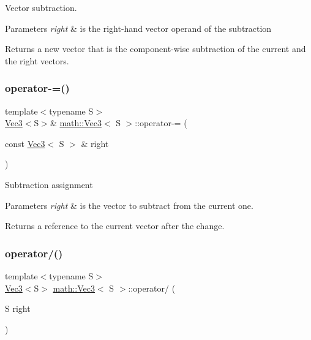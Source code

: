 Vector subtraction.


\begin{DoxyParams}{Parameters}
{\em right} & is the right-\/hand vector operand of the subtraction\\
\hline
\end{DoxyParams}
\begin{DoxyReturn}{Returns}
a new vector that is the component-\/wise subtraction of the current and the right vectors. 
\end{DoxyReturn}
\mbox{\label{classmath_1_1_vec3_a8e49dbf07da4a23576e7b76d3465279d}} 
\subsubsection{\texorpdfstring{operator-\/=()}{operator-=()}}
{\footnotesize\ttfamily template$<$typename S$>$ \\
\hyperlink{classmath_1_1_vec3}{Vec3}$<$S$>$\& \hyperlink{classmath_1_1_vec3}{math\+::\+Vec3}$<$ S $>$\+::operator-\/= (\begin{DoxyParamCaption}\item[{const \hyperlink{classmath_1_1_vec3}{Vec3}$<$ S $>$ \&}]{right }\end{DoxyParamCaption})\hspace{0.3cm}{\ttfamily [inline]}}

Subtraction assignment


\begin{DoxyParams}{Parameters}
{\em right} & is the vector to subtract from the current one.\\
\hline
\end{DoxyParams}
\begin{DoxyReturn}{Returns}
a reference to the current vector after the change. 
\end{DoxyReturn}
\mbox{\label{classmath_1_1_vec3_aeac6cb88e12f56a13f086a1cecfae1c1}} 
\subsubsection{\texorpdfstring{operator/()}{operator/()}\hspace{0.1cm}{\footnotesize\ttfamily [1/2]}}
{\footnotesize\ttfamily template$<$typename S$>$ \\
\hyperlink{classmath_1_1_vec3}{Vec3}$<$S$>$ \hyperlink{classmath_1_1_vec3}{math\+::\+Vec3}$<$ S $>$\+::operator/ (\begin{DoxyParamCaption}\item[{S}]{right }\end{DoxyParamCaption})\hspace{0.3cm}{\ttfamily [inline]}}

